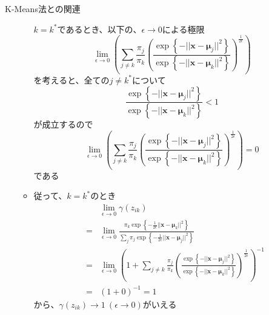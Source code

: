 \documentclass[dvipdfmx,notheorems,t]{beamer}
\begin{document}
\begin{frame}{K-Means法との関連}
\begin{itemize}
\begin{itemize}
		$k = k^*$であるとき、以下の、$\epsilon \to 0$による極限
		\begin{equation}
			\lim_{\epsilon \to 0} \left( \sum_{j \neq k} \frac{\pi_j}{\pi_k} \left( \frac{\exp \left\{ - || \bm{x} - \bm{\mu}_j ||^2 \right\}}{\exp \left\{ - || \bm{x} - \bm{\mu}_k ||^2 \right\}} \right)^{\frac{1}{2\epsilon}} \right)
		\end{equation}
		を考えると、全ての$j \neq k^*$について
		\begin{equation}
			\frac{\exp \left\{ - || \bm{x} - \bm{\mu}_j ||^2 \right\}}{\exp \left\{ - || \bm{x} - \bm{\mu}_k ||^2 \right\}} < 1
		\end{equation}
		が成立するので
		\begin{equation}
			\lim_{\epsilon \to 0} \left( \sum_{j \neq k} \frac{\pi_j}{\pi_k} \left( \frac{\exp \left\{ - || \bm{x} - \bm{\mu}_j ||^2 \right\}}{\exp \left\{ - || \bm{x} - \bm{\mu}_k ||^2 \right\}} \right)^{\frac{1}{2\epsilon}} \right) = 0
		\end{equation}
		である
		\newline
		
		\item 従って、$k = k^*$のとき
		\begin{eqnarray}
			&& \lim_{\epsilon \to 0} \gamma(z_{ik}) \nonumber \\
			&=& \lim_{\epsilon \to 0} \frac{\pi_k \exp \left\{ -\frac{1}{2\epsilon} || \bm{x} - \bm{\mu}_k ||^2 \right\}}{\sum_j \pi_j \exp \left\{ -\frac{1}{2\epsilon} || \bm{x} - \bm{\mu}_j ||^2 \right\}} \nonumber \\
			&=& \lim_{\epsilon \to 0} \left( 1 + \sum_{j \neq k} \frac{\pi_j}{\pi_k} \left( \frac{\exp \left\{ - || \bm{x} - \bm{\mu}_j ||^2 \right\}}{\exp \left\{ - || \bm{x} - \bm{\mu}_k ||^2 \right\}} \right)^{\frac{1}{2\epsilon}} \right)^{-1} \nonumber \\
			&=& (1 + 0)^{-1} = 1
		\end{eqnarray}
		から、$\gamma(z_{ik}) \to 1 \ (\epsilon \to 0)$がいえる
		\newline
		

\end{itemize}
\end{itemize}
\end{frame}
\end{document}

